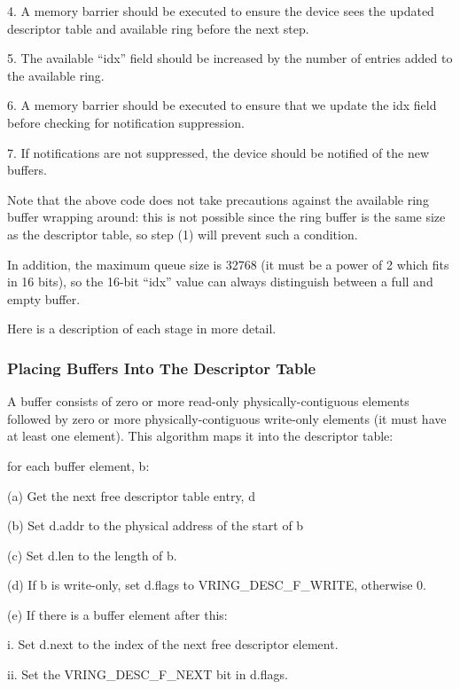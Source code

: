 4. A memory barrier should be executed to ensure the device sees
  the updated descriptor table and available ring before the next
  step.

5. The available “idx” field should be increased by the number of
  entries added to the available ring.

6. A memory barrier should be executed to ensure that we update
  the idx field before checking for notification suppression.

7. If notifications are not suppressed, the device should be
  notified of the new buffers.

Note that the above code does not take precautions against the
available ring buffer wrapping around: this is not possible since
the ring buffer is the same size as the descriptor table, so step
(1) will prevent such a condition.

In addition, the maximum queue size is 32768 (it must be a power
of 2 which fits in 16 bits), so the 16-bit “idx” value can always
distinguish between a full and empty buffer.

Here is a description of each stage in more detail.

\subsubsection{Placing Buffers Into The Descriptor Table}\label{sec:General Initialization And Device Operation / Device Operation / Supplying Buffers to The Device / Placing Buffers Into The Descriptor Table}

A buffer consists of zero or more read-only physically-contiguous
elements followed by zero or more physically-contiguous
write-only elements (it must have at least one element). This
algorithm maps it into the descriptor table:

for each buffer element, b:

  (a) Get the next free descriptor table entry, d

  (b) Set d.addr to the physical address of the start of b

  (c) Set d.len to the length of b.

  (d) If b is write-only, set d.flags to VRING_DESC_F_WRITE,
    otherwise 0.

  (e) If there is a buffer element after this:

    i. Set d.next to the index of the next free descriptor
      element.

    ii. Set the VRING_DESC_F_NEXT bit in d.flags.

